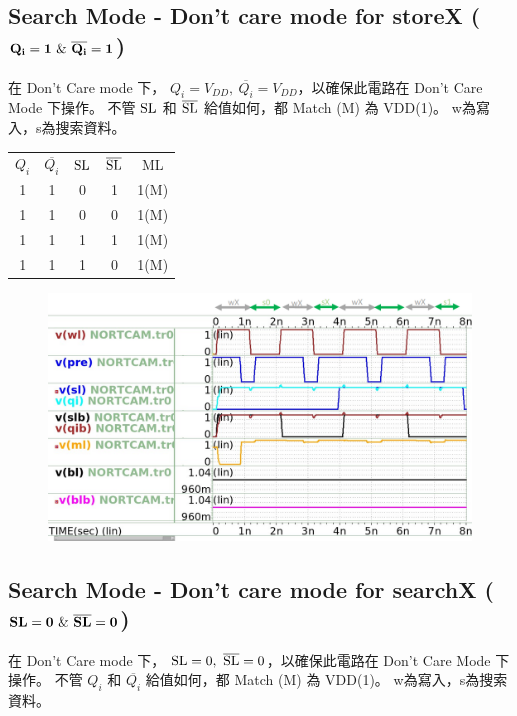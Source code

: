 \documentclass{article}
\begin{document}
\subsection{Search Mode - Don't care mode for storeX ($\bf Q_i = 1\ \&\ \overline{Q_i} = 1$)}

在 Don't Care mode 下， $Q_i = V_{DD},\ \overline{Q_i} = V_{DD}$，以確保此電路在 Don't Care Mode 下操作。
不管 $\rm SL$ 和 $\rm \overline{SL}$ 給值如何，都 Match (M) 為 VDD(1)。
w為寫入，s為搜索資料。

\begin{table}[H]
  \centering
  \begin{tabular}{ccccc}
  $Q_i$ & $\overline{Q_i}$& $\rm SL$ & $\rm \overline{SL}$ & ML \\
  1  & 1     & 0  & 1     & 1(M) \\
  1  & 1     & 0  & 0     & 1(M) \\
  1  & 1     & 1  & 1     & 1(M) \\
  1  & 1     & 1  & 0     & 1(M) \\
 
  \end{tabular}
  \end{table}


\begin{figure}[H]
\centering
\includegraphics[width=\linewidth]{./img/2023-12-14-07-35-29.png}
\end{figure}

\subsection{Search Mode - Don't care mode for searchX ($\bf SL = 0\ \& \ \overline{SL} = 0$)}

在 Don't Care mode 下， $\rm SL = 0,\ \overline{SL} = 0$，以確保此電路在 Don't Care Mode 下操作。
不管 $Q_i$ 和 $\overline{Q_i}$ 給值如何，都 Match (M) 為 VDD(1)。
w為寫入，s為搜索資料。
\end{document}
